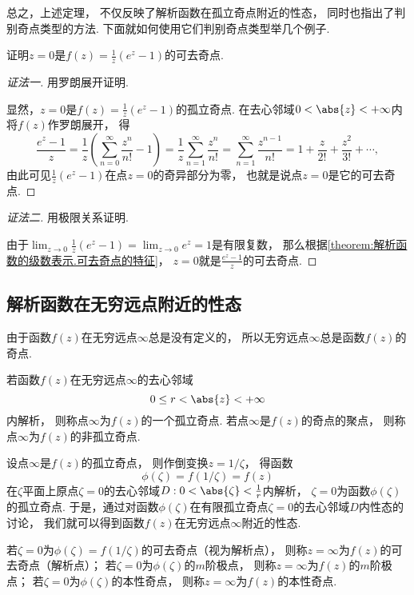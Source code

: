 总之，上述定理，
不仅反映了解析函数在孤立奇点附近的性态，
同时也指出了判别奇点类型的方法.
下面就如何使用它们判别奇点类型举几个例子.

\begin{example}
证明\(z=0\)是\(f(z) = \frac{1}{z} (e^z-1)\)的可去奇点.
\begin{proof}[证法一]
用罗朗展开证明.

显然，\(z=0\)是\(f(z) = \frac{1}{z} (e^z-1)\)的孤立奇点.
在去心邻域\(0<\abs{z}<+\infty\)内将\(f(z)\)作罗朗展开，
得\[
	\frac{e^z-1}{z}
	= \frac{1}{z} \left( \sum_{n=0}^\infty \frac{z^n}{n!} - 1 \right)
	= \frac{1}{z} \sum_{n=1}^\infty \frac{z^n}{n!}
	= \sum_{n=1}^\infty \frac{z^{n-1}}{n!}
	= 1 + \frac{z}{2!} + \frac{z^2}{3!} + \dotsb,
\]
由此可见\(\frac{1}{z} (e^z-1)\)在点\(z=0\)的奇异部分为零，
也就是说点\(z=0\)是它的可去奇点.
\end{proof}
\begin{proof}[证法二]
用极限关系证明.

由于\(\lim_{z\to0} \frac{1}{z} (e^z-1) = \lim_{z\to0} e^z = 1\)是有限复数，
那么根据\cref{theorem:解析函数的级数表示.可去奇点的特征}，
\(z=0\)就是\(\frac{e^z-1}{z}\)的可去奇点.
\end{proof}
\end{example}

\subsection{解析函数在无穷远点附近的性态}
由于函数\(f(z)\)在无穷远点\(\infty\)总是没有定义的，
所以无穷远点\(\infty\)总是函数\(f(z)\)的奇点.

\begin{definition}
若函数\(f(z)\)在无穷远点\(\infty\)的去心邻域\[
	0 \leq r < \abs{z} < +\infty
\]内解析，
则称点\(\infty\)为\(f(z)\)的一个孤立奇点.
若点\(\infty\)是\(f(z)\)的奇点的聚点，
则称点\(\infty\)为\(f(z)\)的非孤立奇点.
\end{definition}

设点\(\infty\)是\(f(z)\)的孤立奇点，
则作倒变换\(z = 1/\zeta\)，
得函数\[
	\phi(\zeta) = f(1/\zeta) = f(z)
\]
在\(\zeta\)平面上原点\(\zeta=0\)的去心邻域\(D: 0<\abs{\zeta}<\frac{1}{r}\)内解析，
\(\zeta=0\)为函数\(\phi(\zeta)\)的孤立奇点.
于是，通过对函数\(\phi(\zeta)\)在有限孤立奇点\(\zeta=0\)的去心邻域\(D\)内性态的讨论，
我们就可以得到函数\(f(z)\)在无穷远点\(\infty\)附近的性态.
\begin{definition}\label{definition:解析函数的级数表示.无穷远处孤立奇点的分类}
若\(\zeta=0\)为\(\phi(\zeta)=f(1/\zeta)\)的可去奇点（视为解析点），
则称\(z=\infty\)为\(f(z)\)的可去奇点（解析点）；
若\(\zeta=0\)为\(\phi(\zeta)\)的\(m\)阶极点，
则称\(z=\infty\)为\(f(z)\)的\(m\)阶极点；
若\(\zeta=0\)为\(\phi(\zeta)\)的本性奇点，
则称\(z=\infty\)为\(f(z)\)的本性奇点.
\end{definition}

